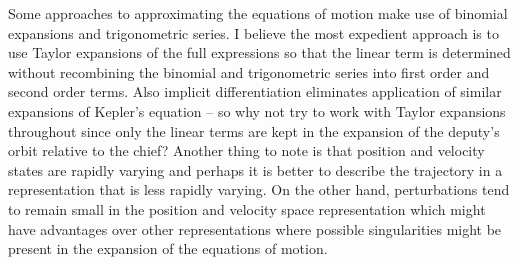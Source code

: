 Some approaches to approximating the equations of motion make use of binomial expansions and trigonometric series. I believe the most expedient approach is to use Taylor expansions of the full expressions so that the linear term is determined without recombining the binomial and trigonometric series into first order and second order terms. Also implicit differentiation eliminates application of similar expansions of Kepler's equation -- so why not try to work with Taylor expansions throughout since only the linear terms are kept in the expansion of the deputy's orbit relative to the chief? Another thing to note is that position and velocity states are rapidly varying and perhaps it is better to describe the trajectory in a representation that is less rapidly varying.
On the other hand, perturbations tend to remain small in the position and velocity space representation which might have advantages over other representations where possible singularities might be present in the expansion of the equations of motion. \\

